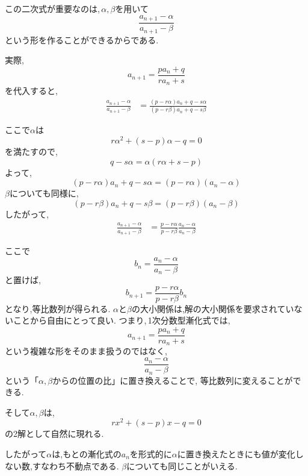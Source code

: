 この二次式が重要なのは,\,$\alpha,\beta$を用いて
\[
  \frac{a_{n+1}-\alpha}{a_{n+1}-\beta}
\]
という形を作ることができるからである.

実際,
\[
  a_{n+1}=\frac{pa_n+q}{ra_n+s}
\]
を代入すると,
\begin{align*}
  \frac{a_{n+1}-\alpha}{a_{n+1}-\beta}
   & =
  \frac{(p-r\alpha)a_n+q-s\alpha}{(p-r\beta)a_n+q-s\beta}
\end{align*}

ここで$\alpha$は
\[
  r\alpha^2+(s-p)\alpha-q=0
\]
を満たすので,
\[
  q-s\alpha
  =\alpha(r\alpha+s-p)
\]
よって,
\[
  (p-r\alpha)a_n+q-s\alpha
  =(p-r\alpha)(a_n-\alpha)
\]
$\beta$についても同様に,
\[
  (p-r\beta)a_n+q-s\beta
  =(p-r\beta)(a_n-\beta)
\]
したがって,
\begin{align*}
  \frac{a_{n+1}-\alpha}{a_{n+1}-\beta}
   & =
  \frac{p-r\alpha}{p-r\beta}
  \frac{a_n-\alpha}{a_n-\beta}
\end{align*}

ここで
\[
  b_n=\frac{a_n-\alpha}{a_n-\beta}
\]
と置けば,
\[
  b_{n+1}
  =
  \frac{p-r\alpha}{p-r\beta}b_n
\]
となり,等比数列が得られる.
$\alpha$と$\beta$の大小関係は,解の大小関係を要求されていないことから自由にとって良い.
つまり,\,1次分数型漸化式では,
\[
  a_{n+1}=\frac{pa_n+q}{ra_n+s}
\]
という複雑な形をそのまま扱うのではなく,
\[
  \frac{a_n-\alpha}{a_n-\beta}
\]
という「$\alpha,\beta$からの位置の比」に置き換えることで,
等比数列に変えることができる.

そして$\alpha,\beta$は,
\[
  rx^2+(s-p)x-q=0
\]
の2解として自然に現れる.

したがって$\alpha$は,もとの漸化式の$a_n$を形式的に$\alpha$に置き換えたときにも値が変化しない数,すなわち不動点である.
$\beta$についても同じことがいえる.

